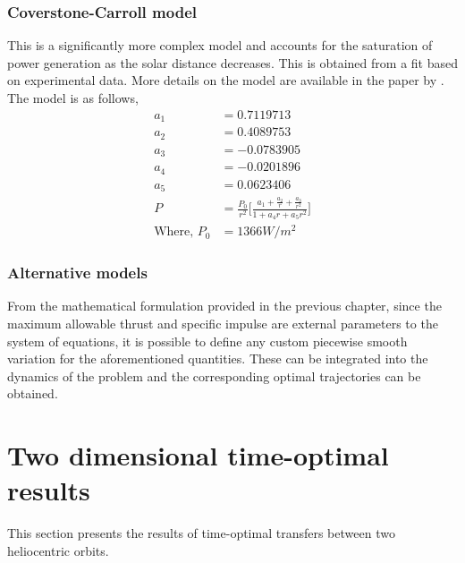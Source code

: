 \subsubsection{Coverstone-Carroll model}
This is a significantly more complex model and accounts for the saturation of power generation as the solar distance decreases. This is obtained from a fit based on experimental data. More details on the model are available in the paper by \cite{williams_benefits_1997}. The model is as follows,
\begin{align}
	a_1&=0.7119713\\
	a_2&=0.4089753\\
	a_3&=-0.0783905\\
	a_4&=-0.0201896\\
	a_5&=0.0623406\\
	P&=\frac{P_0}{r^2}\bigg[\frac{a_1+\frac{a_2}{r}+\frac{a_3}{r^2}}{1+a_4 r+a_5 r^2}\bigg]\\
	\text{Where, }P_0&=1366W/m^2
\end{align}
\subsubsection{Alternative models}
From the mathematical formulation provided in the previous chapter, since the maximum allowable thrust and specific impulse are external parameters to the system of equations, it is possible to define any custom piecewise smooth variation for the aforementioned quantities. These can be integrated into the dynamics of the problem and the corresponding optimal trajectories can be obtained.
\section{Two dimensional time-optimal results}
This section presents the results of time-optimal transfers between two heliocentric orbits. 
